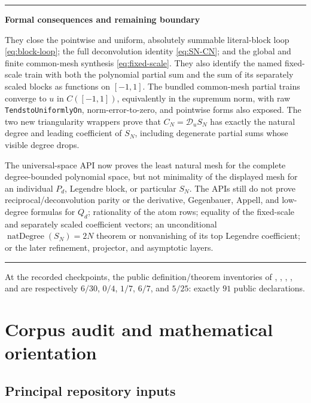 \documentclass[11pt,oneside]{article}
\numberwithin{equation}{section}
\theoremstyle{definition}
\theoremstyle{remark}
\newenvironment{statusbox}[1]{%
  \par\smallskip\noindent\begin{center}\begin{minipage}{0.94\textwidth}%
  \hrule\vspace{0.55em}\noindent\textbf{#1}\par\smallskip
}{%
  \vspace{0.55em}\hrule\end{minipage}\end{center}\smallskip
}
\newcommand{\Dscr}{\mathscr D_u}
\begin{document}
\clearpage
\begin{statusbox}{Formal consequences and remaining boundary}
They close the pointwise
and uniform, absolutely summable literal-block loop
\eqref{eq:block-loop}; the full deconvolution identity \eqref{eq:SN-CN}; and
the global and finite common-mesh synthesis \eqref{eq:fixed-scale}.  They also
identify the named fixed-scale train with both the polynomial partial sum and
the sum of its separately scaled blocks as functions on $[-1,1]$.  The bundled
common-mesh partial trains converge to $u$ in $C([-1,1])$, equivalently in the
supremum norm, with raw \texttt{TendstoUniformlyOn}, norm-error-to-zero, and
pointwise forms also exposed.  The two new triangularity wrappers prove that
$C_N=\Dscr S_N$ has exactly the natural degree and leading coefficient of
$S_N$, including degenerate partial sums whose visible degree drops.

The universal-space API now proves the least natural mesh for the complete
degree-bounded polynomial space, but not minimality of the displayed mesh for
an individual \(P_d\), Legendre block, or particular \(S_N\).  The APIs still
do not prove reciprocal/deconvolution parity or the derivative, Gegenbauer,
Appell, and low-degree formulas for $Q_d$; rationality of the atom rows;
equality of the
fixed-scale and separately scaled coefficient vectors; an unconditional
$\operatorname{natDegree}(S_N)=2N$ theorem or nonvanishing of its top Legendre
coefficient; or the later refinement, projector, and asymptotic layers.
\end{statusbox}

At the recorded checkpoints, the public definition/theorem inventories of
, ,
, ,
and  are respectively $6/30$, $0/4$,
$1/7$, $6/7$, and $5/25$: exactly $91$ public declarations.

\clearpage
\tableofcontents
\clearpage

\section{Corpus audit and mathematical orientation}
\label{sec:audit}

\subsection{Principal repository inputs}
\end{document}
